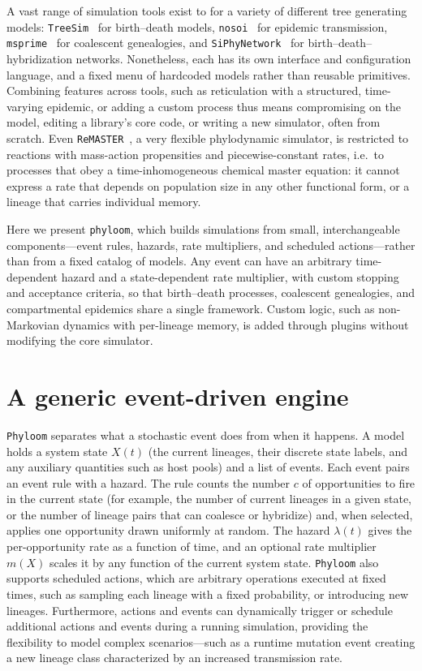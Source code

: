 \documentclass[11pt]{article}
\begin{document}
A vast range of simulation tools exist to for a variety of different
tree generating models:
\texttt{TreeSim}~\citep{stadler2011treesim} for birth--death models,
\texttt{nosoi}~\citep{lequime2020nosoi} for epidemic transmission,
\texttt{msprime}~\citep{baumdicker2022msprime} for coalescent genealogies, and
\texttt{SiPhyNetwork}~\citep{justison2023siphynetwork} for
birth--death--hybridization networks. Nonetheless, each has its own interface and
configuration language, and a fixed menu of hardcoded models rather than
reusable primitives. Combining features across tools, such as reticulation with
a structured, time-varying epidemic, or adding a custom process thus means
compromising on the model, editing a library's core code, or writing a new
simulator, often from scratch. Even \texttt{ReMASTER}~\citep{vaughan2024remaster},
a very flexible phylodynamic simulator, is restricted to reactions with
mass-action propensities and piecewise-constant rates, i.e.\ to processes that
obey a time-inhomogeneous chemical master equation: it cannot express a rate
that depends on population size in any other functional form, or a lineage that
carries individual memory.

Here we present \texttt{phyloom}, which builds simulations from small,
interchangeable components---event rules, hazards, rate multipliers, and
scheduled actions---rather than from a fixed catalog of models. Any event can
have an arbitrary time-dependent hazard and a state-dependent rate multiplier,
with custom stopping and acceptance criteria, so that birth--death processes,
coalescent genealogies, and compartmental epidemics share a single framework.
Custom logic, such as non-Markovian dynamics with per-lineage memory, is added
through plugins without modifying the core simulator.

\section{A generic event-driven engine}

\texttt{Phyloom} separates what a stochastic event does from when it
happens. A model holds a system state $X(t)$ (the current lineages, their
discrete state labels, and any auxiliary quantities such as host pools) and a
list of events. Each event pairs an event rule with a hazard. The
rule counts the number $c$ of opportunities to fire in the current state (for
example, the number of current lineages in a given state, or the number of
lineage pairs that can coalesce or hybridize) and, when selected, applies one
opportunity drawn uniformly at random. The hazard $\lambda(t)$ gives the
per-opportunity rate as a function of time, and an optional
rate multiplier $m(X)$ scales it by any function of the current system
state. \texttt{Phyloom} also supports scheduled actions, which are arbitrary
operations executed at fixed times, such as sampling each lineage with
a fixed probability, or introducing new lineages. Furthermore, actions
and events can dynamically trigger or schedule additional actions and
events during a running simulation, providing the flexibility to model
complex scenarios---such as a runtime mutation event creating a new
lineage class characterized by an increased transmission rate.
\end{document}
